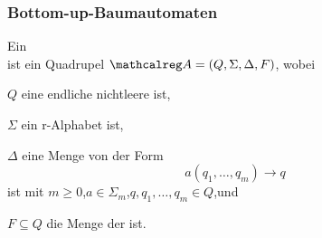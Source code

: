     \begin{frame}
      \frametitle{Bottom-up-Baumautomaten}
      \begin{definition}
        Ein \\
        ist ein Quadrupel $\Aut{A} = (Q,\Sigma,\Delta,F)$, wobei
        \begin{Itemize}
          \item
            $Q$ eine endliche nichtleere  ist,
          \item
            $\Sigma$ ein r-Alphabet ist,
          \item
            $\Delta$ eine Menge von  der Form
            \[
                a(q_1,\dots,q_m) \to q
            \]
            ist mit $m \geqslant 0$,\quad $a \in \Sigma_m$,\quad $q,q_1,\dots,q_m \in Q$,\quad und
          \item
            $F \subseteq Q$ die Menge der  ist.
        \end{Itemize}%
        \label{def:NEBA}%
        \vspace*{-2mm}
      \end{definition}


    \end{frame}

